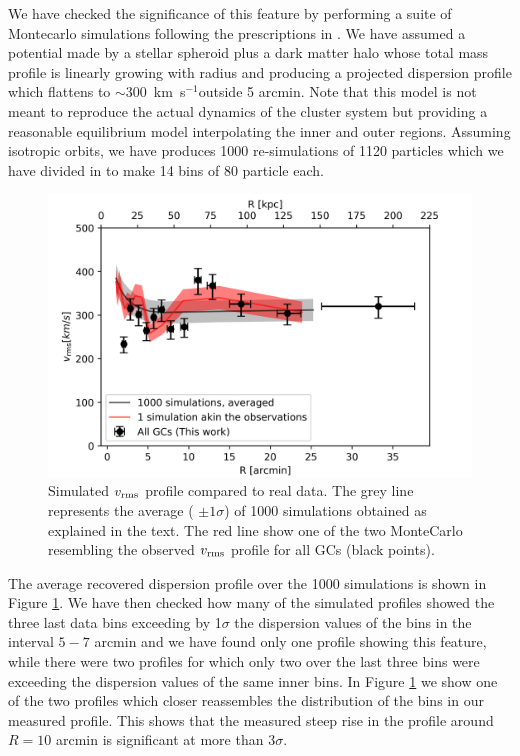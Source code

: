 \documentclass[usenatbib]{mnras}
\newcommand{\kms}{\mbox{\,km~s$^{-1}$}}
\begin{document}
We have checked the significance of this feature by performing a suite of
Montecarlo simulations following the prescriptions in \citet{Napolitano2000}.
We have assumed a potential made by a stellar spheroid plus a dark matter halo
whose total mass profile is linearly growing with radius and producing a projected
dispersion profile which flattens to $\sim 300$ \kms outside 5 arcmin. 
Note that this model is not meant to reproduce
the actual dynamics of the cluster system but providing a reasonable equilibrium
model interpolating the inner and outer regions. Assuming isotropic orbits,
we have produces 1000 re-simulations of 1120 particles which we have divided in
to make 14 bins of 80 particle each.

\begin{figure}
\centering
\includegraphics[width=\columnwidth]{figures/sims.png}
\caption{Simulated $v_{\rm rms}$ profile compared to real data. The grey line 
represents the average ( $\pm 1 \sigma$) of 1000 simulations obtained as explained in the text. 
The red line show one of the two MonteCarlo resembling the observed $v_{\rm rms}$ profile
for all GCs (black points).}
\label{fig:sims}
\end{figure}

The average recovered dispersion profile over the 1000 simulations is shown in
Figure \ref{fig:sims}. We have then checked how many of the simulated
profiles showed the three last data bins exceeding by 1$\sigma$ the dispersion
values of the bins in the interval $5-7$ arcmin and we have found only one profile
showing this feature, while there were two profiles for which only two over the
last three bins were exceeding the dispersion values of the same inner bins.
In Figure \ref{fig:sims} we show one of the two profiles which closer reassembles the
distribution of the bins in our measured profile.
This shows that the measured steep rise in the profile around $R=10$ arcmin is
significant at more than 3$\sigma$.
\end{document}
